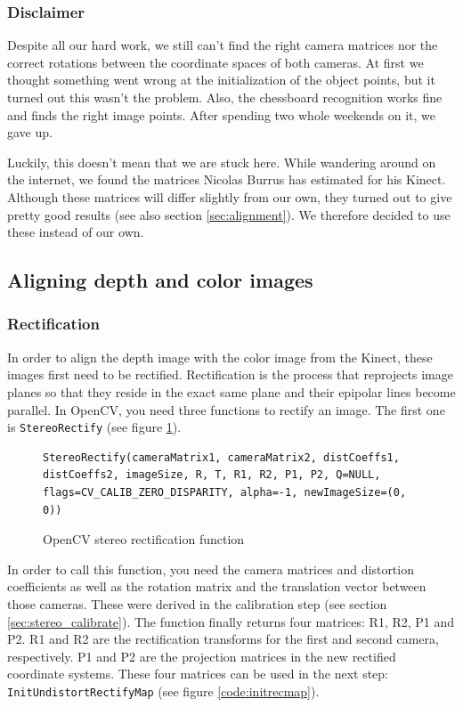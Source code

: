 \subsubsection{Disclaimer}
Despite all our hard work, we still can't find the right camera matrices nor the correct rotations between the coordinate spaces of both cameras. At first we thought something went wrong at the initialization of the object points, but it turned out this wasn't the problem. Also, the chessboard recognition works fine and finds the right image points. After spending two whole weekends on it, we gave up.

Luckily, this doesn't mean that we are stuck here. While wandering around on the internet, we found the matrices Nicolas Burrus has estimated for his Kinect. Although these matrices will differ slightly from our own, they turned out to give pretty good results (see also section \ref{sec:alignment}). We therefore decided to use these instead of our own.


\subsection{Aligning depth and color images}

\subsubsection{Rectification}
In order to align the depth image with the color image from the Kinect, these images first need to be rectified. Rectification is the process that reprojects image planes so that they reside in
the exact same plane and their epipolar lines become parallel. In OpenCV, you need three functions to rectify an image. The first one is \verb|StereoRectify| (see figure \ref{code:stereorectify}).

\begin{figure}[H]
\begin{lstlisting}
StereoRectify(cameraMatrix1, cameraMatrix2, distCoeffs1, distCoeffs2, imageSize, R, T, R1, R2, P1, P2, Q=NULL, flags=CV_CALIB_ZERO_DISPARITY, alpha=-1, newImageSize=(0, 0))
\end{lstlisting}
\caption{OpenCV stereo rectification function}
\label{code:stereorectify}
\end{figure}

In order to call this function, you need the camera matrices and distortion coefficients as well as the rotation matrix and the translation vector between those cameras. These were derived in the calibration step (see section \ref{sec:stereo_calibrate}). The function finally returns four matrices: R1, R2, P1 and P2. R1 and R2 are the rectification transforms for the first and second camera, respectively. P1 and P2 are the projection matrices in the new rectified coordinate systems. These four matrices can be used in the next step: \verb|InitUndistortRectifyMap| (see figure \ref{code:initrecmap}).

